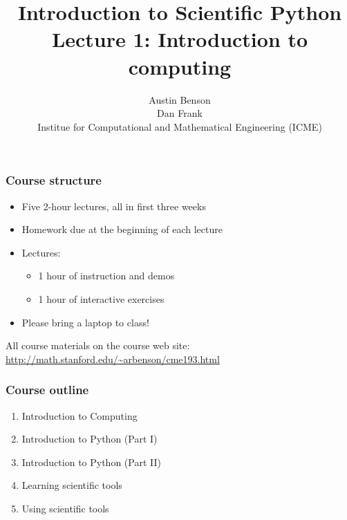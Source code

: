 \documentclass{beamer}
\title{Introduction to Scientific Python \\
Lecture 1: Introduction to computing}
\author{Austin Benson \\
\vspace{0.1in}
Dan Frank \\
\vspace{0.1in}
Institue for Computational and Mathematical Engineering (ICME)}
\begin{document}
\maketitle


\begin{frame}
\frametitle{Course structure}

\begin{itemize}
\setlength{\itemsep}{0.2in}
\item{
Five 2-hour lectures, all in first three weeks
}

\item{
Homework due at the beginning of each lecture
}

\item{
Lectures:
\begin{itemize}
\setlength{\itemsep}{0.05in}
\item{1 hour of instruction and demos}
\item{1 hour of interactive exercises}
\end{itemize}
}

\item{
Please bring a laptop to class!
}
\end{itemize}

\vspace{0.2in}

All course materials on the course web site: \url{http://math.stanford.edu/~arbenson/cme193.html}

\end{frame}

\begin{frame}
\frametitle{Course outline}

\begin{enumerate}
\setlength{\itemsep}{0.2in}

\item{Introduction to Computing}
\item{Introduction to Python (Part I)}
\item{Introduction to Python (Part II)}
\item{Learning scientific tools}
\item{Using scientific tools}

\end{enumerate}

\end{frame}
\end{document}
